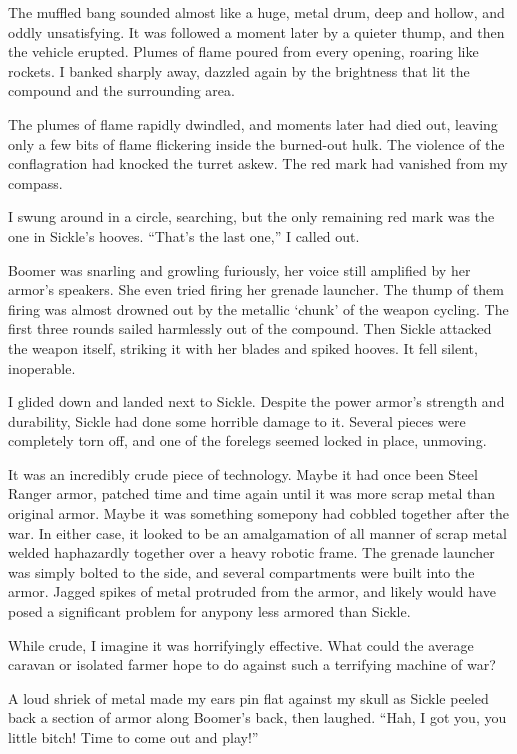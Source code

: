 The muffled bang sounded almost like a huge, metal drum, deep and hollow, and oddly unsatisfying. It was followed a moment later by a quieter thump, and then the vehicle erupted. Plumes of flame poured from every opening, roaring like rockets. I banked sharply away, dazzled again by the brightness that lit the compound and the surrounding area.

The plumes of flame rapidly dwindled, and moments later had died out, leaving only a few bits of flame flickering inside the burned-out hulk. The violence of the conflagration had knocked the turret askew. The red mark had vanished from my compass.

I swung around in a circle, searching, but the only remaining red mark was the one in Sickle’s hooves. “That’s the last one,” I called out.

Boomer was snarling and growling furiously, her voice still amplified by her armor’s speakers. She even tried firing her grenade launcher. The thump of them firing was almost drowned out by the metallic ‘chunk’ of the weapon cycling. The first three rounds sailed harmlessly out of the compound. Then Sickle attacked the weapon itself, striking it with her blades and spiked hooves. It fell silent, inoperable.

I glided down and landed next to Sickle. Despite the power armor’s strength and durability, Sickle had done some horrible damage to it. Several pieces were completely torn off, and one of the forelegs seemed locked in place, unmoving.

It was an incredibly crude piece of technology. Maybe it had once been Steel Ranger armor, patched time and time again until it was more scrap metal than original armor. Maybe it was something somepony had cobbled together after the war. In either case, it looked to be an amalgamation of all manner of scrap metal welded haphazardly together over a heavy robotic frame. The grenade launcher was simply bolted to the side, and several compartments were built into the armor. Jagged spikes of metal protruded from the armor, and likely would have posed a significant problem for anypony less armored than Sickle.

While crude, I imagine it was horrifyingly effective. What could the average caravan or isolated farmer hope to do against such a terrifying machine of war?

A loud shriek of metal made my ears pin flat against my skull as Sickle peeled back a section of armor along Boomer’s back, then laughed. “Hah, I got you, you little bitch! Time to come out and play!”

